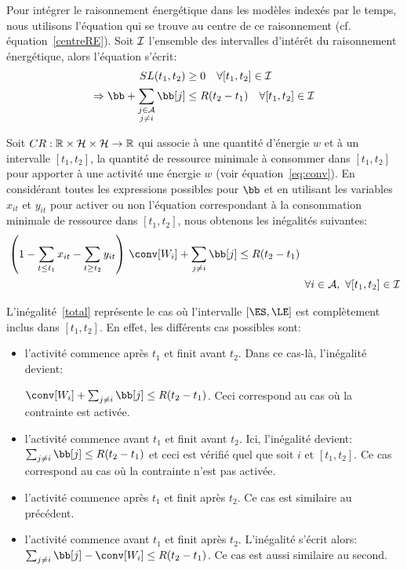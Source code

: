 Pour intégrer le raisonnement énergétique dans les modèles indexés par
le temps, nous utilisons l'équation qui se trouve au centre de ce
raisonnement (cf. équation~\ref{centreRE}). Soit ${\cal I}$ l'ensemble des
intervalles d'intérêt du raisonnement énergétique, alors l'équation
s'écrit:  
\begin{align} 
  SL(t_1,t_2) &\ge 0 \quad \forall [t_1,t_2] \in \I \nonumber\\
  \Rightarrow \bb + \sum_{\substack{j\in \A\\j\neq i}}\bb[j] &\le
  R(t_2-t_1)\quad \forall [t_1,t_2] \in \I \nonumber
\end{align}  

Soit $CR: \mathbb{R} \times {\cal H} \times {\cal H} \rightarrow \mathbb{R}$ qui
associe à une quantité d'énergie $w$ et à un intervalle $[t_1,t_2]$,
la quantité de ressource minimale à consommer dans $[t_1,t_2]$ pour
apporter à une activité une énergie $w$ (voir
équation~\eqref{eq:conv}). En considérant toutes les
expressions possibles pour $\bb$ et en utilisant les variables
$x_{it}$ et $y_{it}$ pour activer ou non l'équation correspondant à la
consommation minimale de ressource dans $[t_1,t_2]$, nous obtenons les
inégalités suivantes: 
\begin{align}
&\left(1-\sum_{t\le t_1}x_{it} - \sum_{t\ge t_2}y_{it}\right) \, \conv[W_i] +
\sum_{j\neq i} \bb[j] \le R(t_2-t_1) \nonumber\\
& \hspace{9.55cm} \forall i \in {\cal A},\ \forall [t_1,t_2] \in \I
\label{total}
\end{align}

L'inégalité~\eqref{total} représente le cas où l'intervalle
$[\ES,\LE]$ est complètement inclus dans $[t_1,t_2]$. En effet,
les différents cas possibles sont: 
\begin{itemize}
\item l'activité commence après $t_1$ et finit avant $t_2$. Dans ce
  cas-là, l'inégalité devient: 

$\conv[W_i] +\sum_{j\neq i} \bb[j] \le
  R(t_2-t_1)$. Ceci correspond au cas où la contrainte est activée. 
\item l'activité commence avant $t_1$ et finit avant $t_2$. Ici,
  l'inégalité devient: $\sum_{j\neq i} \bb[j] \le R(t_2-t_1)$ et ceci
  est vérifié quel que soit $i$ et $[t_1,t_2]$. Ce cas correspond au
  cas où la contrainte n'est pas activée. 
\item l'activité commence après $t_1$ et finit après $t_2$. Ce cas est
  similaire au précédent. 
\item l'activité commence avant $t_1$ et finit après
  $t_2$. L'inégalité s'écrit alors: $\sum_{j\neq i} \bb[j]-\conv[W_i]
  \le R(t_2-t_1)$. Ce cas est aussi similaire au second. 
\end{itemize}

